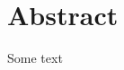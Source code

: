 \documentclass[a4paper]{article}
\author{Mads Sørensen, Bertram Kjær, Lucas Schoubye, Ismail Ali, Mark Nielsen}
\begin{document}
    \maketitle
    \newpage

    \tableofcontents

    \newpage

    \section*{Abstract}
    Some text

    \newpage

    
    
\end{document}
